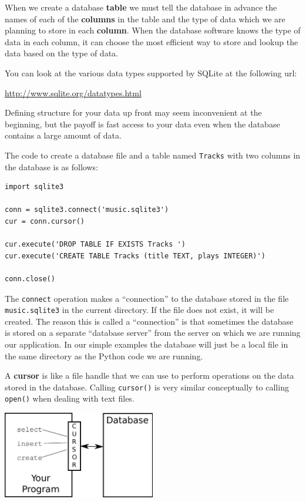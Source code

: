 \documentclass[11pt]{book}
\begin{document}
When we create a database {\bf table} we
must tell the database in advance the names of each of the
{\bf columns} in the table and the type of data which we are 
planning to store in each {\bf column}.   When the database software
knows the type of data in each column, it can choose the most 
efficient way to store and lookup the data based on the type of
data. 

You can look at the various data types supported by SQLite
at the following url:

\url{http://www.sqlite.org/datatypes.html}

Defining structure for your data up front may seem inconvenient
at the beginning, but the payoff is fast access to your data 
even when the database contains a large amount of data.

The code to create a database file and a table 
named {\tt Tracks} with two columns in the 
database is as follows:

\beforeverb
\begin{verbatim}
import sqlite3

conn = sqlite3.connect('music.sqlite3')
cur = conn.cursor()

cur.execute('DROP TABLE IF EXISTS Tracks ')
cur.execute('CREATE TABLE Tracks (title TEXT, plays INTEGER)')

conn.close()
\end{verbatim}
\afterverb
%
The {\tt connect} operation makes a ``connection'' to the database 
stored in the file {\tt music.sqlite3} in the current directory.   If
the file does not exist, it will be created.  The reason this
is called a ``connection'' is that sometimes the database is stored
on a separate ``database server'' from the server on which we 
are running our application.  In our simple examples 
the database will just be a local file in the same directory
as the Python code we are running.

A {\bf cursor} is like a file handle that we can use to perform
operations on the data stored in the database.  Calling 
{\tt cursor()} is very similar conceptually to calling
{\tt open()} when dealing with text files.

\beforefig
\centerline{\includegraphics[height=1.50in]{figs2/cursor.eps}}
\afterfig
\end{document}
